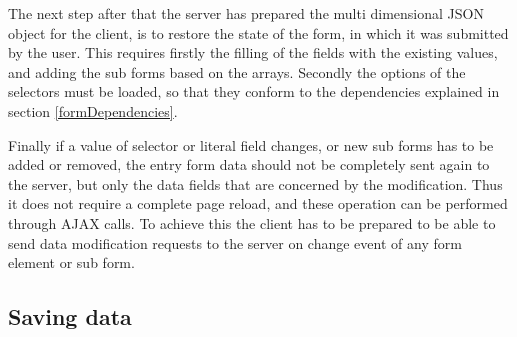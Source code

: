 The next step after that the server has prepared the multi dimensional JSON object for the client, is to restore the state of the form, in which it was submitted by the user. This requires firstly the filling of the fields with the existing values, and adding the sub forms based on the arrays. Secondly the options of the selectors must be loaded, so that they conform to the dependencies explained in section \ref{formDependencies}. 

Finally if a value of selector or literal field changes, or new sub forms has to be added or removed, the entry form data should not be completely sent again to the server, but only the data fields that are concerned by the modification. Thus it does not require a complete page reload, and these operation can be performed through AJAX calls. To achieve this the client has to be prepared to be able to send data modification requests to the server on change event of any form element or sub form.

\subsection{Saving data}













